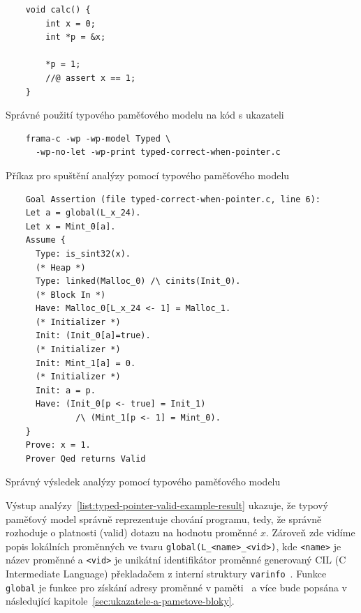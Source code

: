 \begin{listing}[H]
    \begin{verbatim}
    void calc() {
        int x = 0;
        int *p = &x;

        *p = 1;
        //@ assert x == 1;
    }
    \end{verbatim}
    \caption{Správné použití typového paměťového modelu na kód s ukazateli}
    \label{list:typed-pointer-valid-example}
\end{listing}

\begin{listing}[H]
    \begin{verbatim}
    frama-c -wp -wp-model Typed \
      -wp-no-let -wp-print typed-correct-when-pointer.c
    \end{verbatim}
    \caption{Příkaz pro spuštění analýzy pomocí typového paměťového modelu}
    \label{list:typed-pointer-valid-example-run}
\end{listing}

\begin{listing}[H]
    \begin{verbatim}
    Goal Assertion (file typed-correct-when-pointer.c, line 6):
    Let a = global(L_x_24).
    Let x = Mint_0[a].
    Assume {
      Type: is_sint32(x).
      (* Heap *)
      Type: linked(Malloc_0) /\ cinits(Init_0).
      (* Block In *)
      Have: Malloc_0[L_x_24 <- 1] = Malloc_1.
      (* Initializer *)
      Init: (Init_0[a]=true).
      (* Initializer *)
      Init: Mint_1[a] = 0.
      (* Initializer *)
      Init: a = p.
      Have: (Init_0[p <- true] = Init_1)
              /\ (Mint_1[p <- 1] = Mint_0).
    }
    Prove: x = 1.
    Prover Qed returns Valid
    \end{verbatim}
    \caption{Správný výsledek analýzy pomocí typového paměťového modelu}
    \label{list:typed-pointer-valid-example-result}
\end{listing}

Výstup analýzy~\ref{list:typed-pointer-valid-example-result} ukazuje,
že typový paměťový model správně reprezentuje chování programu,
tedy, že správně rozhoduje o platnosti (valid) dotazu na hodnotu proměnné $x$.
Zároveň zde vidíme popis lokálních proměnných ve tvaru \texttt{global(L\_<name>\_<vid>)},
kde \texttt{<name>} je název proměnné a \texttt{<vid>} je unikátní identifikátor proměnné
generovaný CIL (C Intermediate Language) překladačem z interní struktury \texttt{varinfo}~\cite{FCPluginDevSignoles2024}.
Funkce \texttt{global} je funkce pro získání adresy proměnné v paměti~\cite{BlanchardWP2024}
a více bude popsána v následující kapitole~\ref{sec:ukazatele-a-pametove-bloky}.

